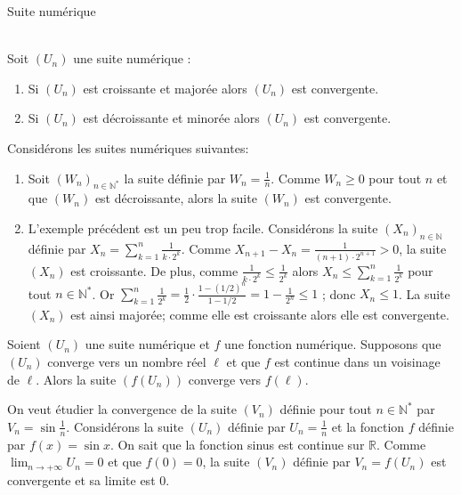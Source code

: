 \begin{chapter}{Suite num\'erique}
\begin{thm}[admis] ~\\
Soit $(U_n)$ une suite num\'erique :
\begin{enumerate}
\item Si $(U_n)$ est croissante et major\'ee alors $(U_n)$ est convergente.
\item Si $(U_n)$ est d\'ecroissante et minor\'ee alors $(U_n)$ est convergente.
\end{enumerate}
\end{thm}
%
\begin{ex}
Consid\'erons les suites num\'eriques suivantes:
\begin{enumerate}
\item Soit $(W_n)_{n \in \mathbb{N}^*}$ la suite d\'efinie par $W_n = \frac{1}{n}$. 
      Comme $W_n \geq 0$ pour tout $n$ et que $(W_n)$ est d\'ecroissante, alors la suite $(W_n)$ est convergente.
\item L'exemple pr\'ec\'edent est un peu trop facile. Consid\'erons la suite $(X_n)_{n \in \mathbb{N}}$ d\'efinie par 
      $X_n = \sum_{k = 1}^n \frac{1}{k \cdot 2^k}$.
      Comme $X_{n+1} - X_n = \frac{1}{(n+1) \cdot 2^{n+1}} > 0$, la suite $(X_n)$ est croissante.
      De plus, comme $\frac{1}{k \cdot 2^k} \leq \frac{1}{2^k}$ alors 
      $X_n \leq \sum_{k = 1}^n \frac{1}{2^k}$ pour tout $n \in \mathbb{N}^*$.
      Or $\sum_{k = 1}^n \frac{1}{2^k} = \frac{1}{2} \cdot \frac{1 - (1/2)^n}{1 - 1/2} = 1 - \frac{1}{2^n} \leq 1$ ; donc $X_n \leq 1$.
      La suite $(X_n)$ est ainsi major\'ee; comme elle est croissante alors elle est convergente.
\end{enumerate}
\end{ex}
%
\begin{thm}
Soient $(U_n)$ une suite num\'erique et $f$ une fonction num\'erique.
Supposons que $(U_n)$ converge vers un nombre r\'eel $\ell$ et que $f$ est continue dans un voisinage de $\ell$.
Alors la suite $(f(U_n))$ converge vers $f(\ell)$.
\end{thm}
\begin{ex}
On veut \'etudier la convergence de la suite $(V_n)$ d\'efinie pour tout $n \in \mathbb{N}^*$ par $V_n = \sin \frac{1}{n}$.
Consid\'erons la suite $(U_n)$ d\'efinie par $U_n = \frac{1}{n}$ et la fonction $f$ d\'efinie par $f(x) = \sin x$.
On sait que la fonction sinus est continue sur $\mathbb{R}$.
Comme $\lim_{n \rightarrow + \infty} U_n = 0$ et que $f(0) = 0$, 
la suite $(V_n)$ d\'efinie par $V_n = f(U_n)$ est convergente et sa limite est $0$.
\end{ex}
%

\end{chapter}
